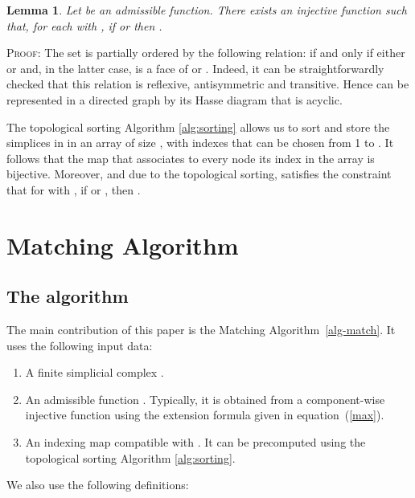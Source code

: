 \documentclass[12pt]{article}
\newtheorem{lem}[thm]{Lemma}
\newenvironment{proof}{\noindent\textsc{Proof: }}{\hfill\par\medskip\par}
\begin{document}
\begin{lem}\label{lem:index}
Let  be an admissible function. There exists an injective function  such that, for each  with ,
if  or  then .
\end{lem}

\begin{proof}
The set  is partially ordered by the following relation:  if and only if either
 or  and, in the latter case,  is a face of  or  .
Indeed, it can be straightforwardly checked that this relation is reflexive, antisymmetric and transitive.
Hence  can be represented in a directed graph by its Hasse diagram that is acyclic.

The topological sorting Algorithm \ref{alg:sorting}  allows us to sort and store the simplices
in  in an array  of size , with indexes that can be chosen from 1 to . It follows that the map  that
associates to every node its index in the array  is bijective. Moreover, and due to the topological sorting,  satisfies the constraint
that for  with , if  or , then .
\end{proof}

\section{Matching Algorithm}
\label{sec:alg}

\subsection{The algorithm}

The main contribution of this paper is the Matching Algorithm~\ref{alg-match}.
It uses the following input data:

\begin{enumerate}
\item A finite simplicial complex .

\item An admissible function . Typically, it is obtained from a component-wise injective function    using  the extension formula given in equation~(\ref{max}).

\item An indexing map  compatible with . It can be precomputed using the topological sorting Algorithm \ref{alg:sorting}.
\end{enumerate}

We also use the following definitions:
\end{document}
